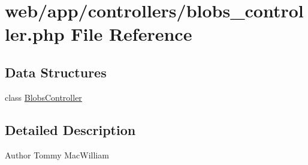 \hypertarget{blobs__controller_8php}{
\section{web/app/controllers/blobs\_\-controller.php File Reference}
\label{blobs__controller_8php}
}
\subsection*{Data Structures}
\begin{DoxyCompactItemize}
\item 
class \hyperlink{class_blobs_controller}{BlobsController}
\end{DoxyCompactItemize}


\subsection{Detailed Description}
\begin{DoxyAuthor}{Author}
Tommy MacWilliam 
\end{DoxyAuthor}
